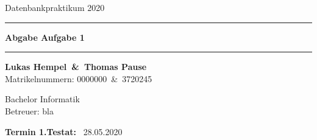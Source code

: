 \begin{titlepage}

    \begin{center}

        \vspace{\fill}
        \huge{Datenbankpraktikum 2020}\\

        \vspace{20pt}

        \hrule
        \vspace{26pt}
        \Huge \textbf{Abgabe Aufgabe 1}
        \vspace{20pt}
        \hrule

        \vspace{10pt}

        \vspace{\fill}
        \Large{\textbf{Lukas Hempel~\&~Thomas Pause}} %
        ~\\
        \Large{Matrikelnummern: 0000000~\&~3720245}

        \Large{Bachelor Informatik}
        ~\\
        \Large{Betreuer: bla}
        \vspace{\fill}

    \end{center}

    \begin{flushright}

        \Large{\textbf{Termin 1.Testat:}} ~\Large{28.05.2020}
    \end{flushright}

\end{titlepage}
